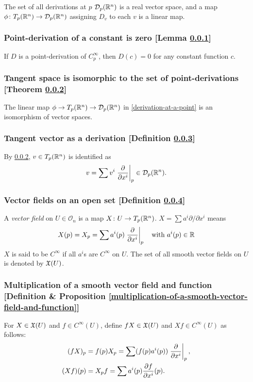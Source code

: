 The set of all derivations at $p$ $\mathcal{D}_p(\mathbb{R}^n)$ is a real vector space, and a map $\phi \colon T_p(\mathbb{R}^n) \to \mathcal{D}_p(\mathbb{R}^n)$ assigning $D_v$ to each $v$ is a linear map.

\subsubsection{Point-derivation of a constant is zero [Lemma \ref{point-derivation-of-a-constant-is-zero}]}\label{point-derivation-of-a-constant-is-zero}
If $D$ is a point-derivation of $C_p^\infty$, then $D(c) = 0$ for any constant function $c$.

\subsubsection{Tangent space is isomorphic to the set of point-derivations [Theorem \ref{tangent-space-is-isomorphic-to-the-set-of-point-derivations}]}\label{tangent-space-is-isomorphic-to-the-set-of-point-derivations}
The linear map $\phi \to T_p(\mathbb{R}^n) \to \mathcal{D}_p(\mathbb{R}^n)$ in \ref{derivation-at-a-point} is an isomorphism of vector spaces.

\subsubsection{Tangent vector as a derivation [Definition \ref{tangent-vector-as-a-derivation}]}\label{tangent-vector-as-a-derivation}
By \ref{tangent-space-is-isomorphic-to-the-set-of-point-derivations}, $v \in T_p(\mathbb{R}^n)$ is identified as
\[
v = \sum v^i \left.\frac{\partial }{\partial x^i}\right|_p \in \mathcal{D}_p(\mathbb{R}^n).
\]

\subsubsection{Vector fields on an open set [Definition \ref{vector-fields-on-an-open-set}]}\label{vector-fields-on-an-open-set}
A \textit{vector field} on $U \in \mathcal{O}_n$ is a map $X \colon U \to T_p(\mathbb{R}^n)$. $X = \sum a^i \partial / \partial x^i$ means
\[
X(p) = X_p = \sum a^i(p) \left. \frac{\partial }{\partial x^i} \right|_p \quad \text{with } a^i (p) \in \mathbb{R}
\]
$X$ is said to be $C^\infty$ if all $a^i$s are $C^\infty$ on $U$. The set of all smooth vector fields on $U$ is denoted by $\mathfrak{X}(U)$.

\subsubsection{Multiplication of a smooth vector field and function [Definition \& Proposition \ref{multiplication-of-a-smooth-vector-field-and-function}]}\label{multipliaction-of-a-smooth-vector-field-and-function}
For $X \in \mathfrak{X}(U)$ and $f \in C^\infty(U)$, define $fX \in \mathfrak{X}(U)$ and $Xf \in C^\infty(U)$ as follows:
\begin{align*}
(fX)_p &= f(p)X_p = \sum (f(p)a^i(p)) \left. \frac{\partial }{\partial x^i}\right|_p,\\
(Xf)(p) &= X_p f = \sum a^i (p) \frac{\partial f}{\partial x^i} (p).
\end{align*}

